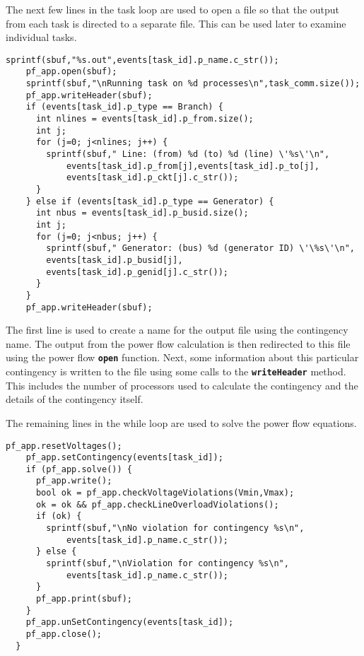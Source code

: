 The next few lines in the task loop are used to open a file so that the output from each task is directed to a separate file. This can be used later to examine individual tasks.

{
\color{red}
\begin{Verbatim}[fontseries=b]
    sprintf(sbuf,"%s.out",events[task_id].p_name.c_str());
    pf_app.open(sbuf);
    sprintf(sbuf,"\nRunning task on %d processes\n",task_comm.size());
    pf_app.writeHeader(sbuf);
    if (events[task_id].p_type == Branch) {
      int nlines = events[task_id].p_from.size();
      int j;
      for (j=0; j<nlines; j++) {
        sprintf(sbuf," Line: (from) %d (to) %d (line) \'%s\'\n",
            events[task_id].p_from[j],events[task_id].p_to[j],
            events[task_id].p_ckt[j].c_str());
      }
    } else if (events[task_id].p_type == Generator) {
      int nbus = events[task_id].p_busid.size();
      int j;
      for (j=0; j<nbus; j++) {
        sprintf(sbuf," Generator: (bus) %d (generator ID) \'\%s\'\n",
        events[task_id].p_busid[j],
        events[task_id].p_genid[j].c_str());
      }
    }
    pf_app.writeHeader(sbuf);
\end{Verbatim}
}

The first line is used to create a name for the output file using the
contingency name. The output from the power flow calculation is then redirected
to this file using the power flow \texttt{\textbf{open}} function. Next, some
information about this particular contingency is written to the file using some
calls to the \texttt{\textbf{writeHeader}} method. This includes the number of processors used to calculate the contingency and the details of the contingency itself.

The remaining lines in the while loop are used to solve the power flow equations.

{
\color{red}
\begin{Verbatim}[fontseries=b]
    pf_app.resetVoltages();
    pf_app.setContingency(events[task_id]);
    if (pf_app.solve()) {
      pf_app.write();
      bool ok = pf_app.checkVoltageViolations(Vmin,Vmax);
      ok = ok && pf_app.checkLineOverloadViolations();
      if (ok) {
        sprintf(sbuf,"\nNo violation for contingency %s\n",
            events[task_id].p_name.c_str());
      } else {
        sprintf(sbuf,"\nViolation for contingency %s\n",
            events[task_id].p_name.c_str());
      }
      pf_app.print(sbuf);
    }
    pf_app.unSetContingency(events[task_id]);
    pf_app.close();
  }
\end{Verbatim}
}


